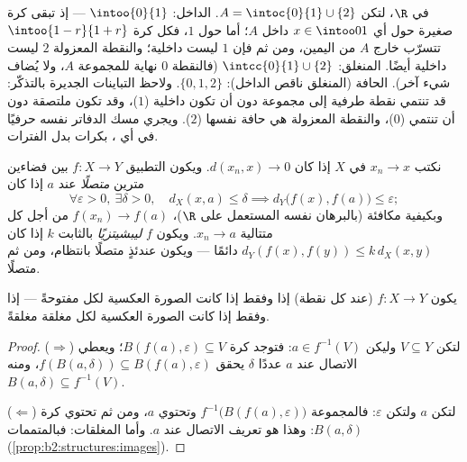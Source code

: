 \begin{example}\label{ex:b2:metric:intclosure}
في $\R$، لتكن $A = \intoc{0}{1} \cup \{2\}$. الداخل:
$\intoo{0}{1}$ --- إذ تبقى كرة صغيرة حول أي $x \in \intoo01$
داخل $A$؛ أما حول $1$، فكل كرة $\intoo{1-r}{1+r}$ تتسرّب
خارج $A$ من اليمين، ومن ثم فإن $1$ ليست داخلية؛ والنقطة
المعزولة $2$ ليست داخلية أيضًا. المنغلق:
$\intcc{0}{1} \cup \{2\}$ (فالنقطة $0$ نهاية للمجموعة $A$،
ولا يُضاف شيء آخر). الحافة (المنغلق ناقص الداخل):
$\{0, 1, 2\}$. ولاحظ التباينات الجديرة بالتذكّر: قد تنتمي نقطة
طرفية إلى مجموعة دون أن تكون داخلية ($1$)، وقد تكون
ملتصقة دون أن تنتمي ($0$)، والنقطة المعزولة
هي حافة نفسها ($2$). ويجري مسك الدفاتر نفسه حرفيًا في
أي ، بكرات بدل الفترات.
\end{example}

\begin{definition}\label{def:b2:metric:continuity}
نكتب $x_n \to x$ في $X$ إذا كان $d(x_n, x) \to 0$. ويكون التطبيق $f \colon X \to Y$
بين فضاءين مترين \emph{متصلًا} عند $a$ إذا كان
\[
\forall \varepsilon > 0,\ \exists\delta > 0,\quad
d_X(x, a) \leq \delta \implies d_Y\bigl(f(x), f(a)\bigr) \leq
\varepsilon ;
\]
وبكيفية مكافئة (بالبرهان نفسه المستعمل على $\R$)، $f(x_n) \to f(a)$ من أجل كل
متتالية $x_n \to a$. ويكون $f$ \emph{ليبشيتزيًا} بالثابت $k$ إذا كان
$d_Y(f(x), f(y)) \leq k\, d_X(x, y)$ دائمًا --- ويكون عندئذٍ متصلًا
بانتظام، ومن ثم متصلًا.
\end{definition}

\begin{theorem}\label{thm:b2:metric:globalcontinuity}
يكون $f \colon X \to Y$  (عند كل نقطة) إذا وفقط إذا كانت
الصورة العكسية لكل  مفتوحةً --- إذا وفقط إذا كانت الصورة العكسية لكل
مغلقة مغلقةً.
\end{theorem}

\begin{proof}
($\Rightarrow$) لتكن $V \subseteq Y$  وليكن $a \in f^{-1}(V)$:
فتوجد كرة $B(f(a), \varepsilon) \subseteq V$؛ ويعطي الاتصال عند $a$
عددًا $\delta$ يحقق $f(B(a, \delta)) \subseteq B(f(a),
\varepsilon)$، ومنه $B(a, \delta) \subseteq f^{-1}(V)$.

($\Leftarrow$) لتكن $a$ ولتكن $\varepsilon$: فالمجموعة $f^{-1}\bigl(B(f(a),
\varepsilon)\bigr)$  وتحتوي $a$، ومن ثم تحتوي كرة
$B(a, \delta)$: وهذا هو تعريف الاتصال عند $a$. وأما المغلقات:
فبالمتممات (\cref{prop:b2:structures:images}).
\end{proof}

